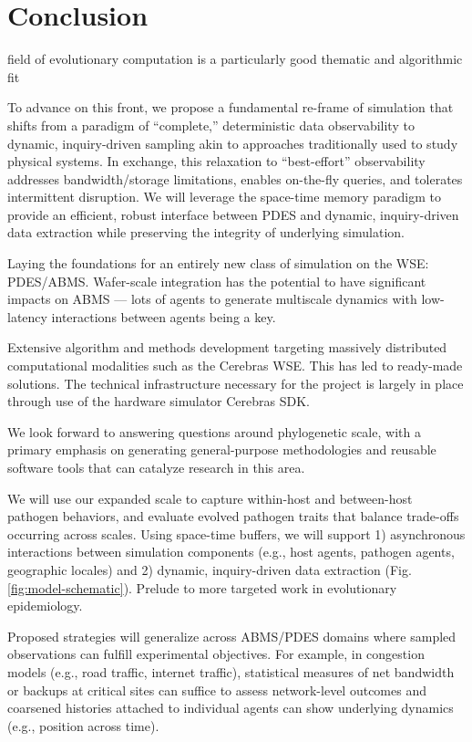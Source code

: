 \section{Conclusion} \label{sec:conclusion}

field of evolutionary computation is a particularly good thematic and algorithmic fit

To advance on this front, we propose a fundamental re-frame of simulation that shifts from a paradigm of ``complete,'' deterministic data observability to dynamic, inquiry-driven sampling akin to approaches traditionally used to study physical systems.
In exchange, this relaxation to ``best-effort'' observability addresses bandwidth/storage limitations, enables on-the-fly queries, and tolerates intermittent disruption.
We will leverage the space-time memory paradigm to provide an efficient, robust interface between PDES and dynamic, inquiry-driven data extraction while preserving the integrity of underlying simulation.

Laying the foundations for an entirely new class of simulation on the WSE: PDES/ABMS.
Wafer-scale integration has the potential to have significant impacts on ABMS --- lots of agents to generate multiscale dynamics with low-latency interactions between agents being a key.

Extensive algorithm and methods development targeting massively distributed computational modalities such as the Cerebras WSE.
This has led to ready-made solutions.
The technical infrastructure necessary for the project is largely in place through use of the hardware simulator Cerebras SDK.

We look forward to answering questions around phylogenetic scale, with a primary emphasis on generating general-purpose methodologies and reusable software tools that can catalyze research in this area.


We will use our expanded scale to capture within-host and between-host pathogen behaviors, and evaluate evolved pathogen traits that balance trade-offs occurring across scales.
Using space-time buffers, we will support 1) asynchronous interactions between simulation components (e.g., host agents, pathogen agents, geographic locales) and 2) dynamic, inquiry-driven data extraction (Fig. \ref{fig:model-schematic}).
Prelude to more targeted work in evolutionary epidemiology.


Proposed strategies will generalize across ABMS/PDES domains where sampled observations can fulfill experimental objectives.
For example, in congestion models (e.g., road traffic, internet traffic), statistical measures of net bandwidth or backups at critical sites can suffice to assess network-level outcomes and coarsened histories attached to individual agents can show underlying dynamics (e.g., position across time).
%